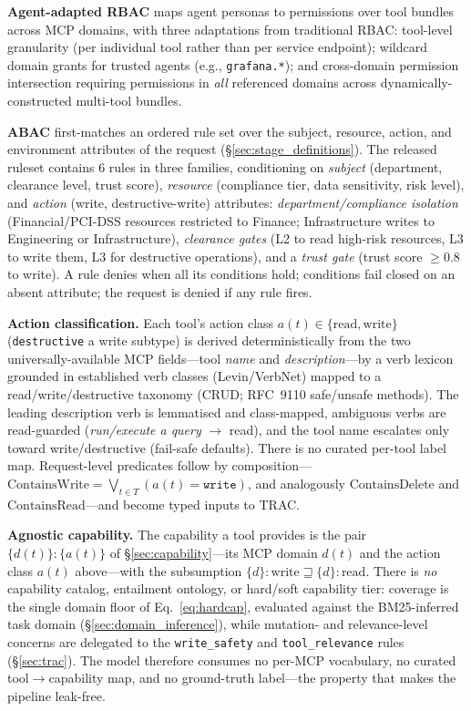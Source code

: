 \documentclass[sigconf,review,anonymous]{acmart}
\begin{document}
\textbf{Agent-adapted RBAC} maps agent personas to permissions over tool bundles across MCP domains, with three adaptations from traditional RBAC: tool-level granularity (per individual tool rather than per service endpoint); wildcard domain grants for trusted agents (e.g., \texttt{grafana.*}); and cross-domain permission intersection requiring permissions in \emph{all} referenced domains across dynamically-constructed multi-tool bundles.

\textbf{ABAC} first-matches an ordered rule set over the subject, resource, action, and environment attributes of the request (\S\ref{sec:stage_definitions}). The released ruleset contains $6$ rules in three families, conditioning on \emph{subject} (department, clearance level, trust score), \emph{resource} (compliance tier, data sensitivity, risk level), and \emph{action} (write, destructive-write) attributes: \emph{department/compliance isolation} (Financial/PCI-DSS resources restricted to Finance; Infrastructure writes to Engineering or Infrastructure), \emph{clearance gates} (L2 to read high-risk resources, L3 to write them, L3 for destructive operations), and a \emph{trust gate} (trust score $\geq 0.8$ to write). A rule denies when all its conditions hold; conditions fail closed on an absent attribute; the request is denied if any rule fires.

\textbf{Action classification.} Each tool's action class $a(t)\in\{\textrm{read},\textrm{write}\}$ (\texttt{destructive} a write subtype) is derived deterministically from the two universally-available MCP fields---tool \emph{name} and \emph{description}---by a verb lexicon grounded in established verb classes (Levin/VerbNet) mapped to a read/write/destructive taxonomy (CRUD; RFC~9110 safe/unsafe methods). The leading description verb is lemmatised and class-mapped, ambiguous verbs are read-guarded (\emph{run/execute a query} $\to$ read), and the tool name escalates only toward write/destructive (fail-safe defaults). There is no curated per-tool label map. Request-level predicates follow by composition---$\text{ContainsWrite} = \bigvee_{t \in T} (a(t)=\texttt{write})$, and analogously $\text{ContainsDelete}$ and $\text{ContainsRead}$---and become typed inputs to TRAC.

\textbf{Agnostic capability.} The capability a tool provides is the pair $\{d(t)\}{:}\{a(t)\}$ of \S\ref{sec:capability}---its MCP domain $d(t)$ and the action class $a(t)$ above---with the subsumption $\{d\}{:}\textrm{write}\sqsupseteq\{d\}{:}\textrm{read}$. There is \emph{no} capability catalog, entailment ontology, or hard/soft capability tier: coverage is the single domain floor of Eq.~\ref{eq:hardcap}, evaluated against the BM25-inferred task domain (\S\ref{sec:domain_inference}), while mutation- and relevance-level concerns are delegated to the \texttt{write\_safety} and \texttt{tool\_relevance} rules (\S\ref{sec:trac}). The model therefore consumes no per-MCP vocabulary, no curated tool$\to$capability map, and no ground-truth label---the property that makes the pipeline leak-free.
\end{document}
